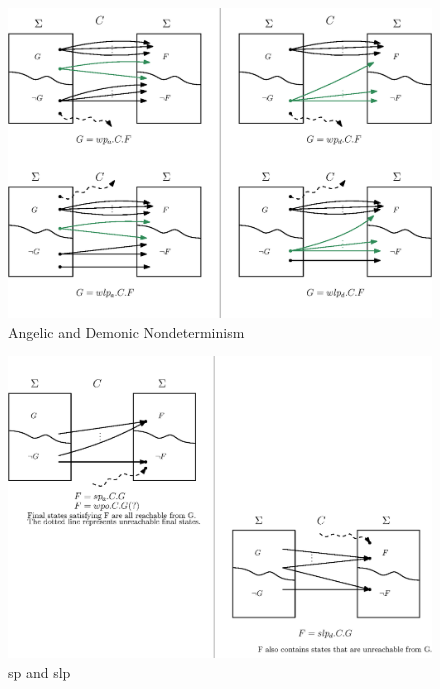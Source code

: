 \begin{figure}[ht!]\centering
\includegraphics[width=\textwidth]{image/wp-wlp-angelic-demonic.eps}
\caption{Angelic and Demonic Nondeterminism}
\label{fig:ang-dem}
\end{figure}


\begin{figure}[ht!]\centering
\includegraphics[width=\textwidth]{image/sp-slp.eps}
\caption{sp and slp}
\label{fig:sp-slp}
\end{figure}
